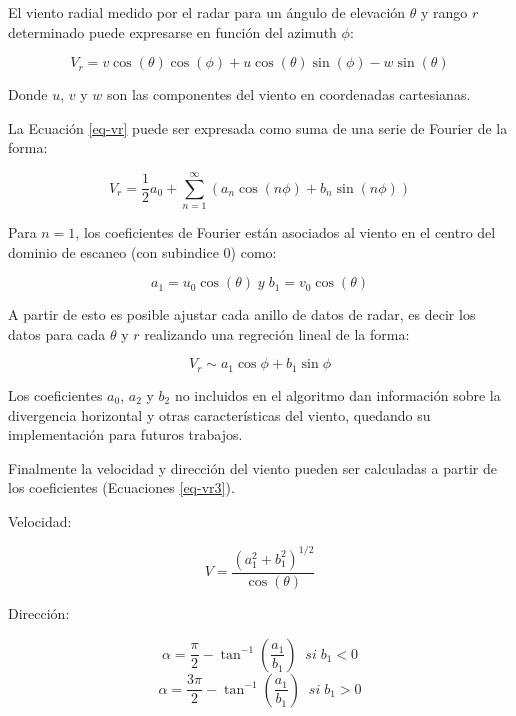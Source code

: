 \documentclass[12pt,spanish,oneside]{book}
\begin{document}
El viento radial medido por el radar para un ángulo de elevación
\(\theta\) y rango \(r\) determinado puede expresarse en función del
azimuth \(\phi\):

\begin{equation}
\label{eq-vr1}
V_r =  v \cos(\theta) \cos(\phi) + u \cos(\theta) \sin(\phi) - w \sin(\theta)
\end{equation}

Donde \(u\), \(v\) y \(w\) son las componentes del viento en coordenadas
cartesianas.

La Ecuación \ref{eq-vr} puede ser expresada como suma de una serie de
Fourier de la forma:

\begin{equation}
\label{eq-vr2}
V_r =  \frac{1}{2}a_0 + \sum_{n = 1}^{\infty} (a_n \cos(n\phi) + b_n \sin(n \phi)) 
\end{equation}

Para \(n=1\), los coeficientes de Fourier están asociados al viento en
el centro del dominio de escaneo (con subindice 0) como:

\begin{equation} \label{eq-vr3}
a_1 = u_0 \cos(\theta) \; y \;
b_1 = v_0 \cos(\theta) 
\end{equation}

A partir de esto es posible ajustar cada anillo de datos de radar, es
decir los datos para cada \(\theta\) y \(r\) realizando una regreción
lineal de la forma:

\begin{equation}
\label{eq-vr4}
V_r \sim a_1\cos \phi + b_1 \sin \phi
\end{equation}

Los coeficientes \(a_0\), \(a_2\) y \(b_2\) no incluidos en el algoritmo
dan información sobre la divergencia horizontal y otras características
del viento, quedando su implementación para futuros trabajos.

Finalmente la velocidad y dirección del viento pueden ser calculadas a
partir de los coeficientes (Ecuaciones \ref{eq-vr3}).

Velocidad:

\begin{equation}
\label{eq-vr5}
V = \frac{(a_{1}^{2} + b_{1}^{2})^{1/2}}{\cos(\theta)}
\end{equation}

Dirección:

\begin{equation}\label{eq-vr6}
\alpha = \frac{\pi}{2}-\tan^{-1}(\frac{a_1}{b_1}) \; \; si \; b_1 < 0 
\end{equation}\begin{equation}\label{eq-vr7}
\alpha = \frac{3\pi}{2}-\tan^{-1}(\frac{a_1}{b_1}) \; \; si \; b_1 > 0
\end{equation}
\end{document}
